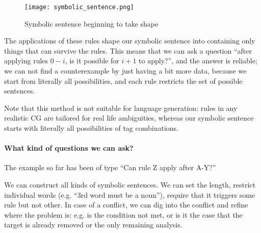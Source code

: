 \begin{figure}[]

\texttt{[image: symbolic\_sentence.png]}

\caption{Symbolic sentence beginning to take shape}
\label{fig:example}
\end{figure}



The applications of these rules shape our symbolic sentence into containing only things that can survive the rules. This means that we can ask a question ``after applying rules $0-i$, is it possible for $i+1$ to apply?'', and the answer is reliable; we can not find a counterexample by just having a bit more data, because we start from literally all possibilities, and each rule
restricts the set of possible sentences.

Note that this method is not suitable for language generation: rules in any realistic CG are tailored for real life ambiguities, whereas our symbolic sentence starts with literally all possibilities of tag combinations.

\paragraph{What kind of questions we can ask?}

The example so far has been of type ``Can rule Z apply after A-Y?''

We can construct all kinds of symbolic sentences. We can set the length, restrict individual words (e.g. ``3rd word must be a noun''), require that it triggers some rule but not other.
In case of a conflict, we can dig into the conflict and refine where the problem is: e.g. is the condition not met, or is it the case that the target is already removed or the only remaining analysis.




